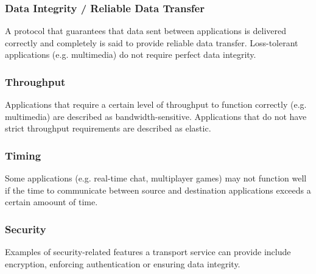 \documentclass[12pt,titlepage]{article}
\begin{document}
      \subsubsection{Data Integrity / Reliable Data Transfer}
        A protocol that guarantees that data sent between applications is delivered correctly and completely is said to provide reliable data transfer. Loss-tolerant applications
        (e.g. multimedia) do not require perfect data integrity.

      \subsubsection{Throughput}
        Applications that require a certain level of throughput to function correctly (e.g. multimedia) are described as bandwidth-sensitive. Applications that do not have strict
        throughput requirements are described as elastic.

      \subsubsection{Timing}
        Some applications (e.g. real-time chat, multiplayer games) may not function well if the time to communicate between source and destination applications exceeds a certain
        amoount of time.

      \subsubsection{Security}
        Examples of security-related features a transport service can provide include encryption, enforcing authentication or ensuring data integrity.
\end{document}
